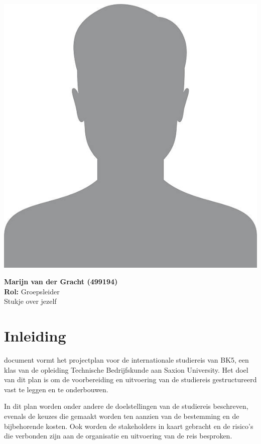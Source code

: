 \documentclass{BK5}
\begin{document}
	\begin{minipage}{0.5\linewidth}
		\includegraphics[width=\linewidth]{unknown.jpg}
	\end{minipage}
	\hfill
	\vspace{1cm}
	\begin{minipage}{\linewidth}
		\textbf{Marijn van der Gracht (499194)} \\
		\textbf{Rol:} Groepsleider \\
		Stukje over jezelf
	\end{minipage}
	
	\newpage
	
	\tableofcontents
	
	\section{Inleiding}
	 document vormt het projectplan voor de internationale studiereis van BK5, een klas van de opleiding Technische Bedrijfskunde aan Saxion University. Het doel van dit plan is om de voorbereiding en uitvoering van de studiereis gestructureerd vast te leggen en te onderbouwen.
	
	In dit plan worden onder andere de doelstellingen van de studiereis beschreven, evenals de keuzes die gemaakt worden ten aanzien van de bestemming en de bijbehorende kosten. Ook worden de stakeholders in kaart gebracht en de risico’s die verbonden zijn aan de organisatie en uitvoering van de reis besproken.
	
\end{document}
